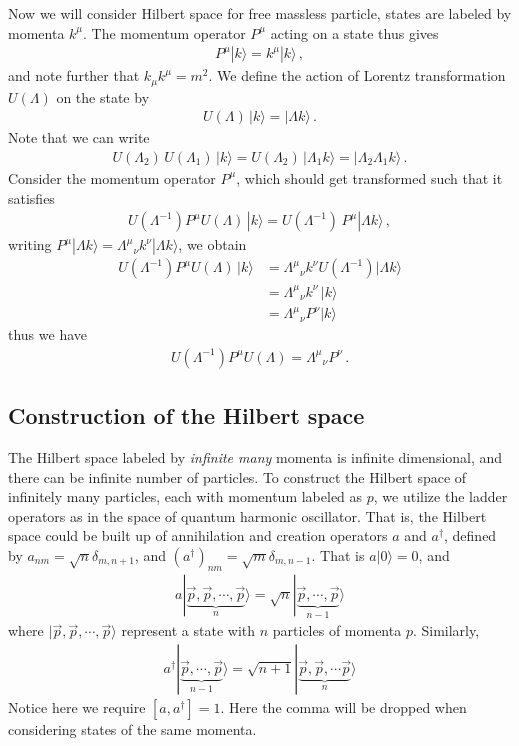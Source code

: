 \documentclass[11pt, onesided]{book}
\theoremstyle{break}
\theoremstyle{break}
\begin{document}
Now we will consider Hilbert space for free massless particle, states are labeled by momenta $k^\mu$. The momentum operator $P^\mu$ acting on a state thus gives
\begin{align*}
P^\mu |k\rangle = k^\mu |k\rangle\,,
\end{align*}
and note further that $k_\mu k^\mu = m^2$. We define the action of Lorentz transformation $U(\Lambda)$ on the state by 
\begin{align*}
U(\Lambda) \, |k\rangle = |\Lambda k\rangle\,.
\end{align*}
Note that we can write
\begin{align*}
U(\Lambda_2) \, U(\Lambda_1)\, |k\rangle = U(\Lambda_2) \, |\Lambda_1 k\rangle = |\Lambda_2 \Lambda_1  k\rangle\,.
\end{align*}
Consider the momentum operator $P^\mu$, which should get transformed such that it satisfies
\begin{align*}
U(\Lambda^{-1}) P^\mu U(\Lambda)\, |k\rangle = U(\Lambda^{-1}) \, P^\mu |\Lambda k\rangle\,,
\end{align*}
writing $P^\mu |\Lambda k\rangle = \Lambda^{\mu}{}_\nu k^\nu |\Lambda k\rangle $, we obtain
\begin{align*}
U(\Lambda^{-1}) P^\mu U(\Lambda)\, |k\rangle 
&= \Lambda^\mu{}_\nu k^\nu U(\Lambda^{-1}) | \Lambda k\rangle \\
&= \Lambda^\mu{}_{\nu} k^\nu \, |k\rangle\\
&= \Lambda^\mu{}_\nu P^\nu |k\rangle
\end{align*}
thus we have
\begin{align*}
U(\Lambda^{-1}) P^\mu U(\Lambda) = \Lambda^\mu{}_\nu P^\nu\,.
\end{align*}
\subsection{Construction of the Hilbert space}
The Hilbert space labeled by \textit{infinite many} momenta is infinite dimensional, and there can be infinite number of particles. To construct the Hilbert space of infinitely many particles, each with momentum labeled as $p$, we utilize the ladder operators as in the space of quantum harmonic oscillator. That is, the Hilbert space could be built up of annihilation and creation operators $a$ and $a^\dagger$, defined by $a_{nm} = \sqrt{n}\delta_{m,n+1}$, and $(a^\dagger )_{nm} = \sqrt{m}\delta_{m, n-1}$. That is $a|0\rangle = 0$, and
\begin{align*}
a|\underbrace{\vec{p},\vec{p},\cdots, \vec{p}}_{n}\rangle = \sqrt{n} |\underbrace{\vec{p}, \cdots ,\vec{p}}_{n-1}\rangle
\end{align*}
where $|\vec{p},\vec{p},\cdots, \vec{p}\rangle$ represent a state with $n$ particles of momenta $p$. Similarly,
\begin{align*}
a^\dagger |\underbrace{\vec{p},\cdots, \vec{p}}_{n-1}\rangle = \sqrt{n+1} |\underbrace{\vec{p},\vec{p}, \cdots \vec{p}}_{n}\rangle
\end{align*}
Notice here we require $[a,a^\dagger] = 1$. Here the comma will be dropped when considering states of the same momenta. \\
\end{document}

